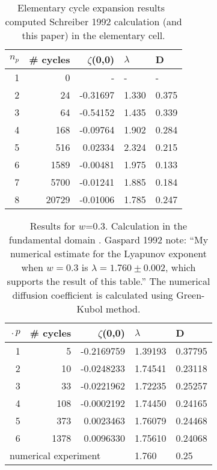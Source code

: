 
\begin{table}[htbp]
	\centering
	\begin{tabular}{|r|r|r|l|l|}
		\hline
		${n_p}$ & \# cycles & $\zeta$(0,0) & $\lambda$ & D \\ 
		\hline\hline
		1      & 0      &   -    &   -  &   - \\
		2      & 24     & -0.31697 & 1.330 & 0.375\\
		3      & 64     & -0.54152 & 1.435 & 0.339\\
		4      & 168    & -0.09764 & 1.902 & 0.284\\
		5      & 516    &  0.02334 & 2.324 & 0.215\\
		6      & 1589   & -0.00481 & 1.975 & 0.133\\
		7      & 5700   & -0.01241 & 1.885 & 0.184\\
		8      & 20729  & -0.01006 & 1.785 & 0.247\\ \hline
	\end{tabular}
	\caption[Elementary cell cycle expansion results of diffusion 
	coefficient]{\label{TCELL1}
		Elementary cycle expansion results~ computed
		Schreiber 1992 calculation (and this paper) in the
		elementary cell.}
\end{table}


\begin{table}[htbp]
	\centering
	\begin{tabular}{|r|r|r|l|l|}
		\hline
		$\period{p}$ & \# cycles & $\zeta$(0,0) & $\lambda$ & D \\ 
		\hline\hline
		1      & 5      & -0.2169759 & 1.39193 & 0.37795 \\
		2      & 10     & -0.0248233 & 1.74541 & 0.23118 \\
		3      & 33     & -0.0221962 & 1.72235 & 0.25257 \\
		4      & 108    & -0.0002192 & 1.74450 & 0.24165 \\
		5      & 373    &  0.0023463 & 1.76079 & 0.24468 \\
		6      & 1378   &  0.0096330 & 1.75610 & 0.24068 \\ 
		\hline\hline
		\multicolumn{3}{|l|}{numerical experiment}
		& 1.760   & 0.25
		\\ \hline
	\end{tabular}
	\caption[Fundamental domain cycle expansion results of diffusion 
	coefficient]{\label{TCELL2}
		Results for $w$=0.3. Calculation in the fundamental domain . 
		Gaspard 
		1992 note: ``My
		numerical estimate for the Lyapunov exponent when $w=0.3$ is
		$\lambda = 1.760 \pm 0.002$, which supports the result of this
		table.'' The numerical diffusion coefficient is calculated 
		using 
		Green-Kubol method. 
	}
\end{table}



